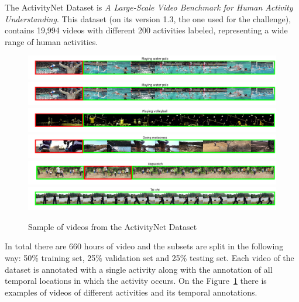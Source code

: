 The ActivityNet Dataset\cite{caba2015activitynet} is \textit{A Large-Scale Video Benchmark for
Human Activity Understanding}. This dataset (on its version 1.3, the one used for the challenge), contains 19,994 videos with different 200 activities labeled, representing a wide range of human activities. 

\begin{figure}[t]
\begin{center}
\includegraphics[width=1\linewidth]{img/methodology/activitynet_examples/activitynet_example_1}
\includegraphics[width=1\linewidth]{img/methodology/activitynet_examples/activitynet_example_2}
\includegraphics[width=1\linewidth]{img/methodology/activitynet_examples/activitynet_example_3}
\includegraphics[width=1\linewidth]{img/methodology/activitynet_examples/activitynet_example_4}
\includegraphics[width=1\linewidth]{img/methodology/activitynet_examples/activitynet_example_5}
\includegraphics[width=1\linewidth]{img/methodology/activitynet_examples/activitynet_example_6}
\end{center}
\caption{Sample of videos from the ActivityNet Dataset}
\label{fig:dataset_example}
\end{figure}

In total there are 660 hours of video and the subsets are split in the following way: 50\% training set, 25\% validation set and 25\% testing set. Each video of the dataset is annotated with a single activity along with the annotation of all temporal locations in which the activity occurs. On the Figure~\ref{fig:dataset_example} there is examples of videos of different activities and its temporal annotations.

